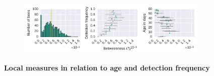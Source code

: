 \begin{figure}[!h]
\begin{subfigure}[b]{1.0\textwidth}
	\end{subfigure}
	\begin{subfigure}[b]{1.0\textwidth}
	\centering
	\includegraphics[width=1.0\textwidth]{Figures/n3-stat-betweenAgeDetF.pdf}
	\end{subfigure}
	\caption[Local measures in relation to age and detection frequency]{\textbf{Local measures in relation to age and detection frequency}}
	\label{fig:n3-degreeStrLCC}
\end{figure}